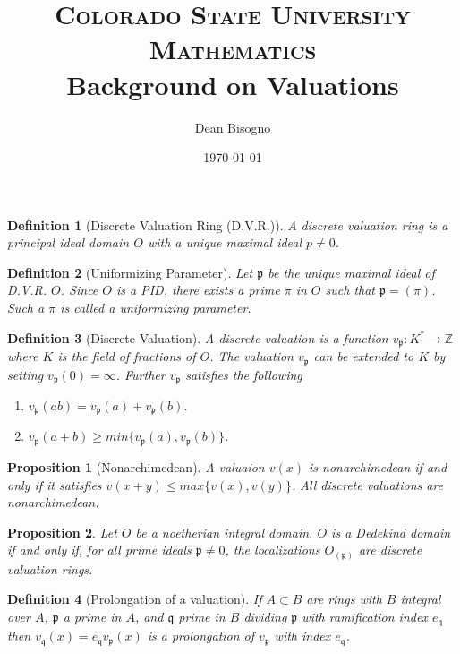 \documentclass[paper=a4, fontsize=11pt]{scrartcl} %
\title{	
\normalfont \normalsize 
\textsc{Colorado State University Mathematics} \\ [25pt] %
\huge Background on Valuations \\ %
}
\author{Dean Bisogno} %
\date{\normalsize\today} %
\numberwithin{equation}{section} %
\numberwithin{figure}{section} %
\numberwithin{table}{section} %
\theoremstyle{break}
\newtheorem{defn}{Definition}
\newtheorem{prop}{Proposition}
\begin{document}
\maketitle
\begin{defn}[Discrete Valuation Ring (D.V.R.)]
A discrete valuation ring is a principal ideal domain $O$ with a unique maximal ideal $p \not= 0$.
\end{defn}

\begin{defn}[Uniformizing Parameter]
Let $\mathfrak{p}$ be the unique maximal ideal of D.V.R. $O$. Since $O$ is a PID, there exists a prime $\pi$ in $O$ such that $\mathfrak{p}=(\pi)$. Such a $\pi$ is called a uniformizing parameter.
\end{defn}
\begin{defn}[Discrete Valuation]
A discrete valuation is a function $v_\mathfrak{p}:K^* \to \mathbb{Z}$ where $K$ is the field of fractions of $O$. The valuation $v_\mathfrak{p}$ can be extended to $K$ by setting $v_\mathfrak{p}(0) = \infty$. Further $v_\mathfrak{p}$ satisfies the following
\begin{enumerate}
\item $v_\mathfrak{p}(ab)=v_\mathfrak{p}(a) + v_\mathfrak{p}(b)$.
\item $v_\mathfrak{p}(a+b) \geq min\{v_\mathfrak{p}(a),v_\mathfrak{p}(b) \}$.
\end{enumerate}
\end{defn}
\begin{prop}[Nonarchimedean]
 A valuaion $v(x)$ is nonarchimedean if and only if it satisfies $v(x+y) \leq max\{v(x),v(y)\}$. All discrete valuations are nonarchimedean.
\end{prop}
\begin{prop}
Let $O$ be a noetherian integral domain. $O$ is a Dedekind domain if and only if, for all prime ideals $\mathfrak{p} \not= 0$, the localizations $O_{(\mathfrak{p})}$ are discrete valuation rings.
\end{prop}
\begin{defn}[Prolongation of a valuation]
If $A \subset B$ are rings with $B$ integral over $A$, $\mathfrak{p}$ a prime in $A$, and $\mathfrak{q}$ prime in $B$ dividing $\mathfrak{p}$ with ramification index $e_\mathfrak{q}$ then $v_\mathfrak{q}(x)=e_\mathfrak{q}v_\mathfrak{p}(x)$ is a prolongation of $v_\mathfrak{p}$ with index $e_\mathfrak{q}$.
\end{defn}
\end{document}
